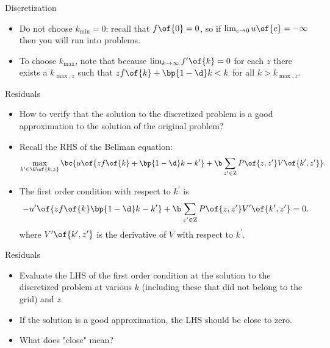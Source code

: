 \documentclass[11pt,xcolor={dvipsnames},aspectratio=159,hyperref={pdftex,pdfpagemode=UseNone,hidelinks,pdfdisplaydoctitle=true},usepdftitle=false]{beamer}
\begin{document}
\begin{frame}{Discretization}   
    \begin{itemize}
        \item Do not choose $k_{\min}=0$: recall that $f\of{0}=0$, so if $\lim_{c\rightarrow 0 } u\of{c} = -\infty$ then you will run into problems.
        \item To choose $k_{\max}$, note that because $\lim_{k\rightarrow \infty} f^\prime\of{k} = 0$ for each $z$ there exists a $k_{\max,z}$ such that $zf\of{k}+\bp{1-\d}k<k$ for all $k>k_{\max,z}$.
    \end{itemize}
    \end{frame}
    
    
\begin{frame}{Residuals}   
    \begin{itemize}
        \item How to verify that the solution to the discretized problem is a good approximation to the solution of the original problem?
        \item Recall the RHS of the Bellman equation: \begin{align*}
            \max_{k^\prime \in \G\of{k,z}} \bc{u\of{z f\of{k} + \bp{1-\d}k - k^\prime} + \b \sum_{z^\prime \in \text{Z}} P\of{z,z^\prime} V\of{k^\prime,z^\prime} }.
        \end{align*}
        \item The first order condition with respect to $k^\prime$ is \begin{align*}
            - u^\prime\of{z f\of{k} \bp{1-\d}k - k^\prime} + \b \sum_{z^\prime \in \text{Z}} P\of{z,z^\prime} V^\prime\of{k^\prime,z^\prime} = 0.
        \end{align*}
        where $V^\prime\of{k^\prime,z^\prime}$ is the derivative of $V$ with respect to $k^\prime$.
    \end{itemize}
    \end{frame}
            
\begin{frame}{Residuals}   
    \begin{itemize}
        \item Evaluate the LHS of the first order condition at the solution to the discretized problem at various $k$ (including these that did not belong to the grid) and $z$.
        \item If the solution is a good approximation, the LHS should be close to zero.
        \item What does "close" mean?
    \end{itemize}
    \end{frame}
\end{document}
